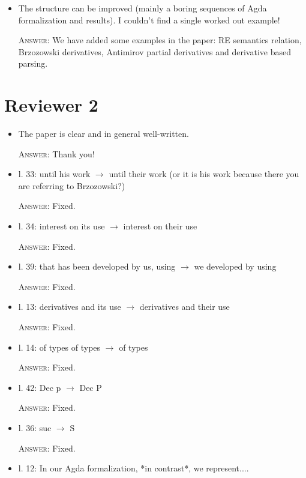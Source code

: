\documentclass{article}
\begin{document}
\begin{itemize}
     \item The structure can be improved (mainly a boring sequences of Agda formalization and results).
           I couldn't find a single worked out example!
           
     \textsc{Answer}: We have added some examples in the paper: RE semantics relation, Brzozowski derivatives,
     Antimirov partial derivatives and derivative based parsing.
\end{itemize}

\section*{Reviewer 2}

\begin{itemize}
    \item The paper is clear and in general well-written. 
    
    \textsc{Answer}: Thank you!
    
    \item l. 33: until his work $\to$ until their work (or it is his work because there you are referring to Brzozowski?)
    
    \textsc{Answer:} Fixed.
    
    \item l. 34: interest on its use $\to$ interest on their use

    \textsc{Answer}: Fixed.
    
    \item l. 39: that has been developed by us, using $\to$ we developed by using

    \textsc{Answer}: Fixed.

    \item l. 13: derivatives and its use $\to$ derivatives and their use

    \textsc{Answer}: Fixed.

    \item l. 14: of types of types $\to$ of types

    \textsc{Answer}: Fixed.

    \item l. 42: Dec p $\to$ Dec P

    \textsc{Answer}: Fixed.

    \item l. 36: suc $\to$ S

    \textsc{Answer}: Fixed.

    \item l. 12: In our Agda formalization, *in contrast*, we represent....


\end{itemize}
\end{document}
